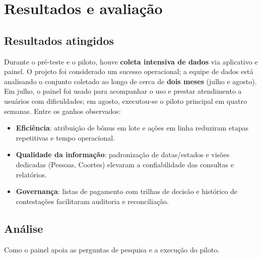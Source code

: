 
\chapter{Resultados e avaliação}
\label{cap:resultados}

\section{Resultados atingidos}
Durante o pré-teste e o piloto, houve \textbf{coleta intensiva de dados} via
aplicativo e painel. O projeto foi considerado um sucesso operacional; a equipe
de dados está analisando o conjunto coletado ao longo de cerca de \textbf{dois
meses} (julho e agosto). Em julho, o painel foi usado para acompanhar o uso e
prestar atendimento a usuários com dificuldades; em agosto, executou-se o
piloto principal em quatro semanas. Entre os ganhos observados:
\begin{itemize}
  \item \textbf{Eficiência}: atribuição de bônus em lote e ações em linha
        reduziram etapas repetitivas e tempo operacional.
  \item \textbf{Qualidade da informação}: padronização de datas/estados e
        visões dedicadas (Pessoas, Coortes) elevaram a confiabilidade das
        consultas e relatórios.
  \item \textbf{Governança}: listas de pagamento com trilhas de decisão e
        histórico de contestações facilitaram auditoria e reconciliação.
\end{itemize}


\section{Análise}
Como o painel apoia as perguntas de pesquisa e a execução do piloto\citep{interscity:pilotoBikeSP}.



